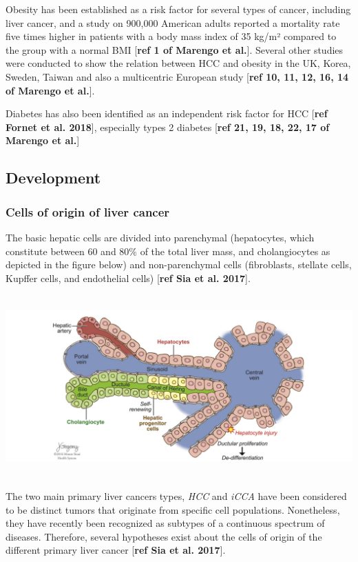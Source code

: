 \documentclass[]{article}
\begin{document}
Obesity has been established as a risk factor for several types of
cancer, including liver cancer, and a study on 900,000 American adults
reported a mortality rate five times higher in patients with a body mass
index of 35 kg/m² compared to the group with a normal BMI {[}\textbf{ref
1 of Marengo et al.}{]}. Several other studies were conducted to show
the relation between HCC and obesity in the UK, Korea, Sweden, Taiwan
and also a multicentric European study {[}\textbf{ref 10, 11, 12, 16, 14
of Marengo et al.}{]}.

Diabetes has also been identified as an independent risk factor for HCC
{[}\textbf{ref Fornet et al. 2018}{]}, especially types 2 diabetes
{[}\textbf{ref 21, 19, 18, 22, 17 of Marengo et al.}{]}

\subsection{Development}\label{development}

\subsubsection{Cells of origin of liver
cancer}\label{cells-of-origin-of-liver-cancer}

The basic hepatic cells are divided into parenchymal (hepatocytes, which
constitute between 60 and 80\% of the total liver mass, and
cholangiocytes as depicted in the figure below) and non-parenchymal
cells (fibroblasts, stellate cells, Kupffer cells, and endothelial
cells) {[}\textbf{ref Sia et al. 2017}{]}.

\includegraphics[width=6.26772in,height=2.75000in]{./images/media/image7.png}

The two main primary liver cancers types, \emph{HCC} and \emph{iCCA}
have been considered to be distinct tumors that originate from specific
cell populations. Nonetheless, they have recently been recognized as
subtypes of a continuous spectrum of diseases. Therefore, several
hypotheses exist about the cells of origin of the different primary
liver cancer {[}\textbf{ref Sia et al. 2017}{]}.
\end{document}

